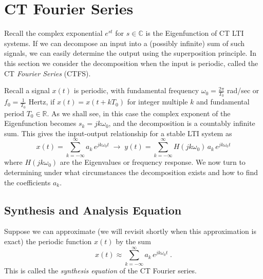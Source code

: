 \chapter{CT Fourier Series}

Recall the complex exponential $e^{st}$ for $s\in\mathbb{C}$ is the Eigenfunction of CT LTI systems. If we can decompose an input into a (possibly infinite) sum of such signals, we can easily determine the output using the superposition principle. In this section we consider the decomposition when the input is periodic, called the CT \emph{Fourier Series} (CTFS).

Recall a signal $x(t)$ is periodic, with fundamental frequency $\omega_0 = \frac{2\pi}{T_0}$ rad/sec or $f_0 = \frac{1}{T_0}$ Hertz, if $x(t) = x(t+kT_0)$ for integer multiple $k$ and fundamental period $T_0\in \mathbb{R}$. As we shall see, in this case the complex exponent of the Eigenfunction becomes $s_k = jk\omega_0$, and the decomposition is a countably infinite sum. This gives the input-output relationship for a stable LTI system as 
\[
x(t) = \sum\limits_{k = -\infty}^{\infty} a_k \, e^{j k\omega_0 t} \; \longrightarrow\; y(t) = \sum\limits_{k = -\infty}^{\infty} H(j k\omega_0)\, a_k \, e^{j k\omega_0 t}
\]
where $H(j k\omega_0)$ are the Eigenvalues or frequency response. We now turn to determining under what circumstances the decomposition exists and how to find the coefficients $a_k$.

\section{Synthesis and Analysis Equation}

Suppose we can approximate (we will revisit shortly when this approximation is exact) the periodic function $x(t)$ by the sum
\[
\boxed{x(t) \approx \sum\limits_{k = -\infty}^{\infty} a_k \, e^{j k\omega_0 t}\;.}
\]
This is called the \emph{synthesis equation} of the CT Fourier series.

